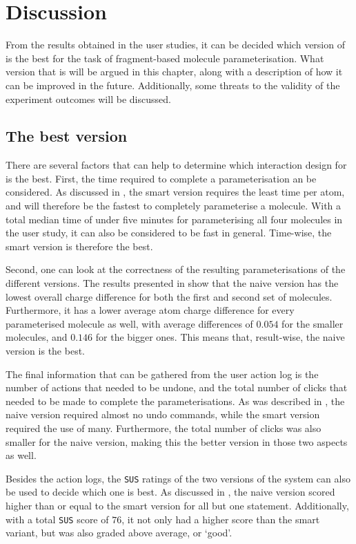 \chapter{Discussion}

From the results obtained in the user studies, it can be decided which version of \oframp{} is the best for the task of fragment-based molecule parameterisation. What version that is will be argued in this chapter, along with a description of how it can be improved in the future. Additionally, some threats to the validity of the experiment outcomes will be discussed.


\section{The best version}
There are several factors that can help to determine which interaction design for \oframp{} is the best. First, the time required to complete a parameterisation an be considered. As discussed in , the smart version requires the least time per atom, and will therefore be the fastest to completely parameterise a molecule. With a total median time of under five minutes for parameterising all four molecules in the user study, it can also be considered to be fast in general. Time-wise, the smart version is therefore the best.

Second, one can look at the correctness of the resulting parameterisations of the different versions. The results presented in  show that the naive version has the lowest overall charge difference for both the first and second set of molecules. Furthermore, it has a lower average atom charge difference for every parameterised molecule as well, with average differences of $0.054$ for the smaller molecules, and $0.146$ for the bigger ones. This means that, result-wise, the naive version is the best.

The final information that can be gathered from the user action log is the number of actions that needed to be undone, and the total number of clicks that needed to be made to complete the parameterisations. As was described in , the naive version required almost no undo commands, while the smart version required the use of many. Furthermore, the total number of clicks was also smaller for the naive version, making this the better version in those two aspects as well.

Besides the action logs, the \verb|SUS| ratings of the two versions of the system can also be used to decide which one is best. As discussed in , the naive version scored higher than or equal to the smart version for all but one statement. Additionally, with a total \verb|SUS| score of $76$, it not only had a higher score than the smart variant, but was also graded above average, or `good'.

